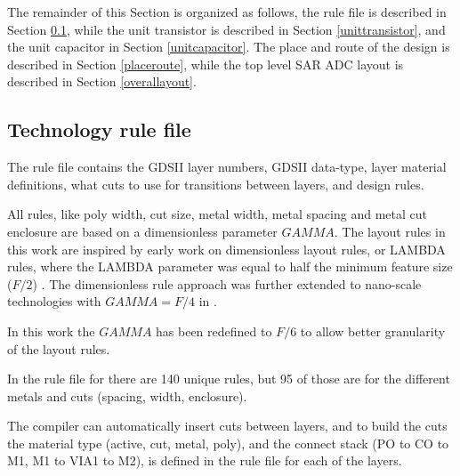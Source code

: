 The remainder of this Section is organized as follows, the rule file is described in Section \ref{rule}, while the unit
transistor is described in Section \ref{unittransistor}, and the unit
capacitor in Section \ref{unitcapacitor}. The place and route of the
design is described in Section \ref{placeroute}, while the top level
SAR ADC layout is described in Section \ref{overallayout}.

\subsection{Technology rule file} \label{rule}
The rule file contains the GDSII layer numbers, GDSII data-type, layer
material definitions, what cuts  to use for transitions
between layers, and design rules.

All rules, like poly width, cut size, metal width, metal
spacing and metal cut enclosure are based on a dimensionless parameter
$\mathit{GAMMA}$. The layout rules in this work are inspired by early work on dimensionless layout
rules, or LAMBDA rules, where the LAMBDA parameter was equal to half the minimum feature
size ($\mathit{F/2}$) \cite{mead.conway}. The dimensionless rule approach was further extended
to nano-scale technologies with $\mathit{GAMMA = F/4}$ in
\cite{lewyn09,lewyn11}.

In this
work the $\mathit{GAMMA}$ has been redefined to $\mathit{F/6}$ to allow better
granularity of the layout rules.

In the rule file for  {\technm}
 there are 140 unique rules, but 95 of those are for the
different metals and cuts (spacing, width, enclosure).

The compiler can automatically insert cuts between layers, and to build
the cuts the material type (active, cut, metal, poly), and the connect stack (PO to CO to
M1, M1 to VIA1 to M2), is defined in the
rule file for each of the layers.


